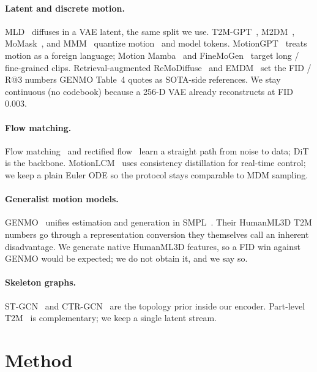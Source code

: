 \documentclass[10pt,twocolumn]{article}
\begin{document}
\paragraph{Latent and discrete motion.}
MLD~\cite{chen2023mld} diffuses in a VAE latent, the same split we use.
T2M-GPT~\cite{zhang2023t2mgpt}, M2DM~\cite{kong2023m2dm}, MoMask~\cite{guo2024momask}, and MMM~\cite{pinyoanuntapong2024mmm} quantize motion~\cite{van2017vqvae,esser2021vqgan} and model tokens.
MotionGPT~\cite{jiang2023motiongpt} treats motion as a foreign language; Motion Mamba~\cite{zhang2024motionmamba} and FineMoGen~\cite{zhang2023finemogen} target long / fine-grained clips.
Retrieval-augmented ReMoDiffuse~\cite{zhang2023remodiffuse} and EMDM~\cite{zhou2024emdm} set the FID / R@3 numbers GENMO Table~4 quotes as SOTA-side references.
We stay continuous (no codebook) because a 256-D VAE already reconstructs at FID $0.003$.

\paragraph{Flow matching.}
Flow matching~\cite{lipman2023flow} and rectified flow~\cite{liu2023rectified} learn a straight path from noise to data; DiT~\cite{peebles2023dit} is the backbone.
MotionLCM~\cite{dai2024motionlcm} uses consistency distillation for real-time control; we keep a plain Euler ODE so the protocol stays comparable to MDM sampling.

\paragraph{Generalist motion models.}
GENMO~\cite{li2025genmo} unifies estimation and generation in SMPL~\cite{loper2015smpl}.
Their HumanML3D T2M numbers go through a representation conversion they themselves call an inherent disadvantage.
We generate native HumanML3D features, so a FID win against GENMO would be expected; we do not obtain it, and we say so.

\paragraph{Skeleton graphs.}
ST-GCN~\cite{yan2018stgcn} and CTR-GCN~\cite{chen2021ctrgcn} are the topology prior inside our encoder.
Part-level T2M~\cite{zou2024parco,zhong2023att2m} is complementary; we keep a single latent stream.

\section{Method}
\end{document}
